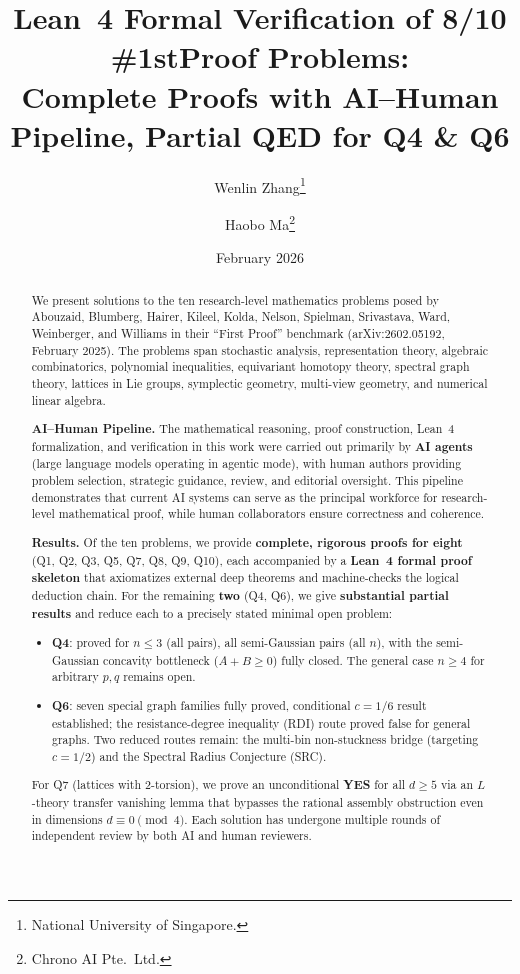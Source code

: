 \documentclass[11pt]{article}
\title{Lean~4 Formal Verification of 8/10 \#1stProof Problems:\\[4pt]
       Complete Proofs with AI--Human Pipeline,
       Partial QED for Q4 \& Q6}
\author{%
  Wenlin Zhang\thanks{%
    National University of Singapore.}
  \and
  Haobo Ma\thanks{%
    Chrono AI Pte.\ Ltd.}
}
\date{February 2026}
\theoremstyle{definition}
\theoremstyle{remark}
\begin{document}
\maketitle

\begin{abstract}
We present solutions to the ten research-level mathematics problems
posed by Abouzaid, Blumberg, Hairer, Kileel, Kolda, Nelson, Spielman,
Srivastava, Ward, Weinberger, and Williams in their ``First Proof''
benchmark (arXiv:2602.05192, February 2025).
The problems span stochastic analysis, representation theory,
algebraic combinatorics, polynomial inequalities, equivariant homotopy
theory, spectral graph theory, lattices in Lie groups, symplectic geometry,
multi-view geometry, and numerical linear algebra.

\medskip\noindent
\textbf{AI--Human Pipeline.}\quad
The mathematical reasoning, proof construction, Lean~4 formalization,
and verification in this work were carried out primarily by
\textbf{AI agents} (large language models operating in agentic mode),
with human authors providing problem selection, strategic guidance,
review, and editorial oversight.
This pipeline demonstrates that current AI systems can serve as the
principal workforce for research-level mathematical proof, while
human collaborators ensure correctness and coherence.

\medskip\noindent
\textbf{Results.}\quad
Of the ten problems, we provide \textbf{complete, rigorous proofs for
eight} (Q1, Q2, Q3, Q5, Q7, Q8, Q9, Q10), each accompanied by a
\textbf{Lean~4 formal proof skeleton} that axiomatizes external deep
theorems and machine-checks the logical deduction chain.
For the remaining \textbf{two} (Q4, Q6), we give \textbf{substantial
partial results} and reduce each to a precisely stated minimal open
problem:
\begin{itemize}[nosep,topsep=2pt]
\item \textbf{Q4}: proved for $n\le 3$ (all pairs), all semi-Gaussian
  pairs (all $n$), with the semi-Gaussian concavity bottleneck
  ($A+B\ge 0$) fully closed.
  The general case $n\ge 4$ for arbitrary $p,q$ remains open.
\item \textbf{Q6}: seven special graph families fully proved,
  conditional $c=1/6$ result established;
  the resistance-degree inequality (RDI) route proved false
  for general graphs.
  Two reduced routes remain: the multi-bin non-stuckness bridge
  (targeting $c=1/2$) and the Spectral Radius Conjecture (SRC).
\end{itemize}
\noindent
For Q7 (lattices with 2-torsion), we prove an unconditional
\textbf{YES} for all $d\ge 5$ via an $L$-theory transfer vanishing lemma
that bypasses the rational assembly obstruction even in dimensions
$d\equiv 0\pmod{4}$.
Each solution has undergone multiple rounds of independent review
by both AI and human reviewers.


\end{abstract}
\end{document}
